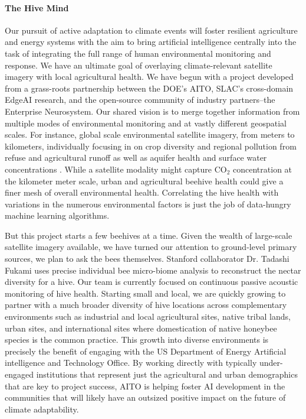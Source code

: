 \paragraph{The Hive Mind}
Our pursuit of active adaptation to climate events will foster resilient agriculture and energy systems with the aim to bring artificial intelligence centrally into the task of integrating the full range of human environmental monitoring and response.
We have an ultimate goal of overlaying climate-relevant satellite imagery with local agricultural health.
We have begun with a project developed from a grass-roots partnership between the DOE's AITO, SLAC's cross-domain EdgeAI research, and the open-source community of industry partners--the Enterprise Neurosystem.
Our shared vision is to merge together information from multiple modes of environmental monitoring and at vastly different geospatial scales.
For instance, global scale environmental satellite imagery, from meters to kilometers, individually focusing in on crop diversity and regional pollution from refuse \cite{TomasBeaches} and agricultural runoff \cite{NeonicsOnBees} as well as aquifer health \cite{GRACE_CongoBasinWatershed} and surface water concentrations \cite{SurfaceWater}.
While a satellite modality might capture CO$_2$ concentration \cite{GlobalCO2} at the kilometer meter scale, urban and agricultural beehive health could give a finer mesh of overall environmental health.
Correlating the hive health with variations in the numerous environmental factors is just the job of data-hungry machine learning algorithms.

But this project starts a few beehives at a time.
Given the wealth of large-scale satellite imagery available, we have turned our attention to ground-level primary sources, we plan to ask the bees themselves. 
Stanford collaborator Dr. Tadashi Fukami uses precise individual bee micro-biome analysis \cite{Fukami2022} to reconstruct the nectar diversity for a hive.
Our team is currently focused on continuous passive acoustic monitoring of hive health.
Starting small and local, we are quickly growing to partner with a much broader diversity of hive locations across complementary environments such as industrial and local agricultural sites, native tribal lands, urban sites, and international sites where domestication of native honeybee species is the common practice. 
This growth into diverse environments is precisely the benefit of engaging with the US Department of Energy Artificial intelligence and Technology Office.
By working directly with typically under-engaged institutions that represent just the agricultural and urban demographics that are key to project success, AITO is helping foster AI development in the communities that will likely have an outsized positive impact on the future of climate adaptability.

